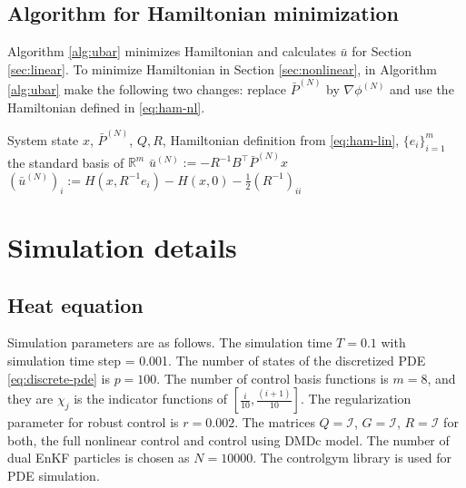 \documentclass[10pt,a4paper]{amsart}
\newcommand{\tp}{^\top}
\newcommand{\inv}{^{-1}}
\newcommand{\R}{\mathbb{R}}
\newcommand{\half}{\frac{1}{2}}
\newcommand{\grad}{\nabla}
\newcommand{\id}{\mathcal{I}}
\begin{document}
\subsection{Algorithm for Hamiltonian minimization }
\label{app:ubar}
Algorithm \ref{alg:ubar} minimizes Hamiltonian and calculates $\bar{u}$ for Section \ref{sec:linear}. To minimize Hamiltonian in Section \ref{sec:nonlinear}, in Algorithm \ref{alg:ubar} make the following two changes: replace $\bar{P}^{(N)}$  by $\grad\phi^{(N)}$ and use the Hamiltonian defined in \eqref{eq:ham-nl}.
\begin{algorithm}
\begin{algorithmic}[1]
\Input System state $x$, $\bar{P}^{(N)}$, $Q,R$, Hamiltonian definition from \eqref{eq:ham-lin}, $\{e_i\}_{i=1}^{m}$ the standard basis of $\R^m$
\State \Return $\bar{u}^{(N)} := -R\inv B\tp \bar{P}^{(N)}x$
    \State $(\bar{u}^{(N)})_i := H(x,R\inv e_i) - H(x,0) - \half (R\inv)_{ii}$
    \EndFor
\EndIf
\end{algorithmic}
\caption{Algorithm for Hamiltonian minimization}
\label{alg:ubar}
\end{algorithm}

\section{Simulation details}
\subsection{Heat equation}
\label{app:heat}
Simulation parameters are as follows. The simulation time $T = 0.1$ %
with simulation time step = 0.001. 
The number of states of the discretized PDE \eqref{eq:discrete-pde} is $p=100$. 
The number of control basis functions is $m=8$, and they are $\chi_j$ is the indicator functions of $[\frac{i}{10},\frac{(i+1)}{10}]$. The regularization parameter for robust control is $r = 0.002$.
The matrices  $Q = \id$, $G=\id$, $R=\id$ for both, the full nonlinear control and control using DMDc model.
The number of dual EnKF particles is chosen as $N=10000$. The controlgym library \cite{zhang2023controlgym} is used for PDE simulation. 
\end{document}
